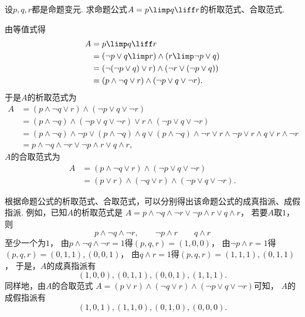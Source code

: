 \begin{example}
设\(p,q,r\)都是命题变元.
求命题公式\(A = p \limp q \liff r\)的析取范式、合取范式.
\begin{solution}
由等值式得\begin{align*}
	A &= p \limp q \liff r \\
	&= (\neg p \lor q \limp r) \land (r \limp \neg p \lor q) \\
	&= (\neg(\neg p \lor q) \lor r) \land (\neg r \lor (\neg p \lor q)) \\
	&= (p \land \neg q \lor r) \land (\neg p \lor q \lor \neg r).
\end{align*}
于是\(A\)的析取范式为\begin{align*}
	A &= (p \land \neg q \lor r) \land (\neg p \lor q \lor \neg r) \\
	&= (p \land \neg q) \land (\neg p \lor q \lor \neg r)
		\lor r \land (\neg p \lor q \lor \neg r) \\
	&= (p \land \neg q) \land \neg p
		\lor (p \land \neg q) \land q
		\lor (p \land \neg q) \land \neg r
		\lor r \land \neg p
		\lor r \land q
		\lor r \land \neg r \\
	&= p \land \neg q \land \neg r
		\lor \neg p \land r
		\lor q \land r,
\end{align*}
\(A\)的合取范式为\begin{align*}
	A &= (p \land \neg q \lor r) \land (\neg p \lor q \lor \neg r) \\
	&= (p \lor r) \land (\neg q \lor r) \land (\neg p \lor q \lor \neg r).
\end{align*}
\end{solution}
\end{example}

根据命题公式的析取范式、合取范式，可以分别得出该命题公式的成真指派、成假指派.
例如，已知\(A\)的析取范式是
\(A = p \land \neg q \land \neg r
\lor \neg p \land r
\lor q \land r\)，
若要\(A\)取\(1\)，
则\[
	p \land \neg q \land \neg r,
	\qquad
	\neg p \land r
	\qquad
	q \land r
\]至少一个为\(1\)，
由\(p \land \neg q \land \neg r = 1\)得\((p,q,r) = (1,0,0)\)，
由\(\neg p \land r = 1\)得\((p,q,r) = (0,1,1),(0,0,1)\)，
由\(q \land r = 1\)得\((p,q,r) = (1,1,1),(0,1,1)\)，
于是，\(A\)的成真指派有\[
	(1,0,0),
	(0,1,1),
	(0,0,1),
	(1,1,1).
\]
同样地，由\(A\)的合取范式
\(A = (p \lor r) \land (\neg q \lor r) \land (\neg p \lor q \lor \neg r)\)可知，
\(A\)的成假指派有\[
	(1,0,1),
	(1,1,0),
	(0,1,0),
	(0,0,0).
\]

